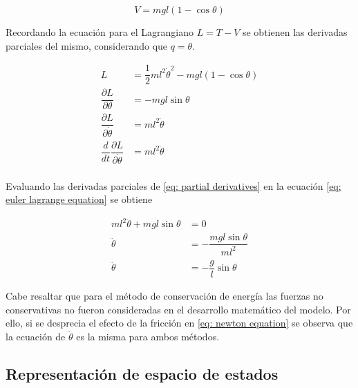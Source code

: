 \begin{equation*}
 V = m g l \left( 1 - \cos{\theta} \right)
 \label{eq: potential energy}
\end{equation*}

Recordando la ecuación para el Lagrangiano $L = T - V$ se obtienen las 
derivadas parciales del mismo, considerando que $q = \theta$.

\begin{equation}
 \begin{split}
  L & = \dfrac{1}{2}m l^2 \dot{\theta}^2 - m g l (1 - \cos{\theta})\\
  \dfrac{\partial L}{\partial \theta} &= - m g l \sin{\theta} \\
  \dfrac{\partial L}{\partial \dot{\theta}} &= m l^2 \dot{\theta}\\
  \dfrac{d}{dt}\dfrac{\partial L}{\partial \dot{\theta}} &=ml^2 \ddot{\theta}\\
 \end{split}
 \label{eq: partial derivatives}
\end{equation}

Evaluando las derivadas parciales de \eqref{eq: partial derivatives} en 
la ecuación \eqref{eq: euler lagrange equation} se obtiene

\begin{equation}
 \begin{split}
    ml^2 \ddot{\theta} + m g l \sin{\theta} &= 0\\
    \ddot{\theta} &= -\dfrac{mgl \sin{\theta}}{ml^2}\\
    \ddot{\theta} &= - \dfrac{g}{l} \sin{\theta}
 \end{split}
\end{equation}

Cabe resaltar que para el método de conservación de 
energía las fuerzas no conservativas no 
fueron consideradas en el desarrollo matemático del modelo.
Por ello, si se desprecia el efecto de la fricción en 
\eqref{eq: newton equation} se observa que la ecuación
de $\ddot{\theta}$ es la misma para ambos métodos.

\subsection{Representación de espacio de estados}

